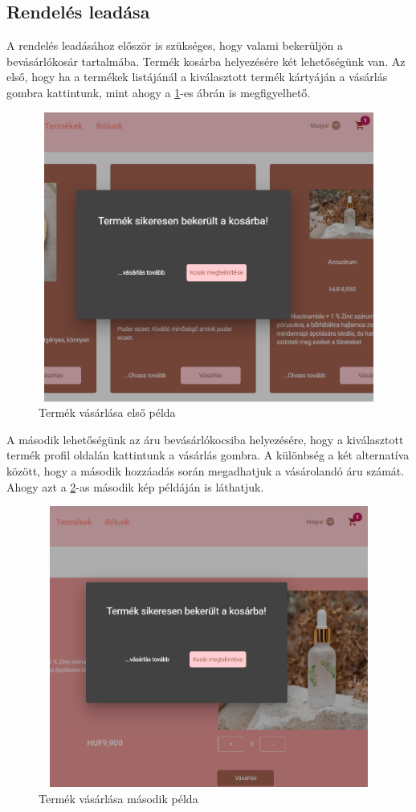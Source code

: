 \subsection{Rendelés leadása}
A rendelés leadásához először is szükséges, hogy valami bekerüljön a bevásárlókosár tartalmába. Termék kosárba helyezésére két lehetőségünk van. Az első, hogy ha a termékek listájánál a kiválasztott termék kártyáján a vásárlás gombra kattintunk, mint ahogy a \ref{fig.exemple-7}-es ábrán is megfigyelhető.
\begin{figure}[H]
	\centering
	\includegraphics[width=1.0\textwidth,height=360px]{images/termek_vasarlas_1.png}
	\caption{Termék vásárlása első példa}
	\label{fig.exemple-7}
\end{figure}

A második lehetőségünk az áru bevásárlókocsiba helyezésére, hogy a kiválasztott termék profil oldalán kattintunk a vásárlás gombra. A különbség a két alternatíva között, hogy a második hozzáadás során megadhatjuk a vásárolandó áru számát. Ahogy azt a \ref{fig.exemple-8}-as második kép példáján is láthatjuk.
\begin{figure}[H]
	\centering
	\includegraphics[width=1.0\textwidth,height=350px]{images/termek_vasarlas_2.png}
	\caption{Termék vásárlása második példa}
	\label{fig.exemple-8}
\end{figure}

